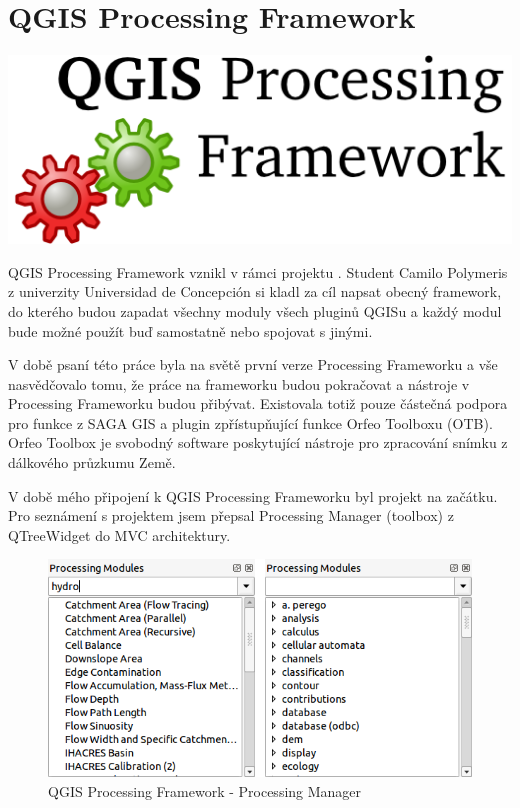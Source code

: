 \newpage
{}
\section{QGIS Processing Framework}
\nocite{pf:www}


\begin{center}
		\includegraphics[scale=0.30]{pictures/qgis_pf}
\end{center}

QGIS Processing Framework vznikl v rámci projektu  . Student Camilo Polymeris z univerzity Universidad de Concepción si kladl za cíl napsat obecný framework, do kterého budou zapadat všechny moduly všech pluginů QGISu a každý modul bude možné použít buď samostatně nebo spojovat s jinými.

V době psaní této práce byla na světě první verze Processing Frameworku a vše nasvědčovalo tomu, že práce na frameworku budou pokračovat a nástroje v Processing Frameworku budou přibývat. Existovala totiž pouze částečná  podpora pro funkce z SAGA GIS a plugin zpřístupňující funkce  Orfeo Toolboxu (OTB). Orfeo Toolbox je svobodný software poskytující nástroje pro zpracování snímku z  dálkového průzkumu Země.

V době mého připojení k QGIS Processing Frameworku byl projekt na začátku. Pro seznámení s projektem jsem přepsal Processing Manager (toolbox) z QTreeWidget do MVC architektury.

\begin{figure}[h]
	\centering
	\includegraphics[scale=0.5]{pictures/pf/processing_manager_small}
	\caption{QGIS Processing Framework - Processing Manager}
  	\label{pf:pm}
\end{figure}

